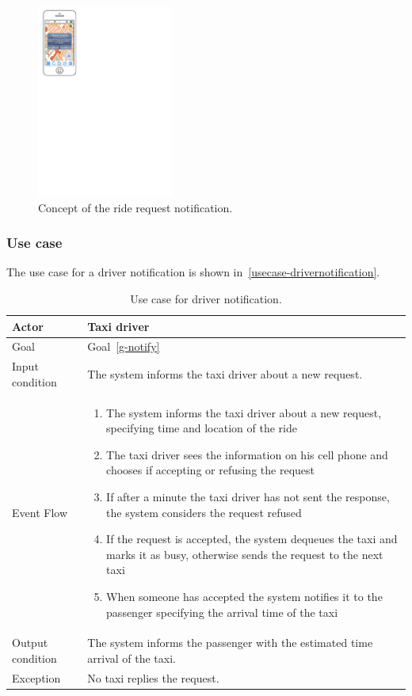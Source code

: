 \begin{figure}
\begin{center}
\includegraphics[width=0.4\textwidth]{mockup/RideRequest.pdf}
\caption{Concept of the ride request notification.}
\label{fig:mockup-riderequest}
\end{center}
\end{figure}

\subsubsection{Use case}
The use case for a driver notification is shown in~\autoref{usecase-drivernotification}.

\begin{table}
\begin{center}
\begin{tabular}{| l | p{} |}
\hline
Actor & Taxi driver \\
\hline
Goal & Goal~\ref{g-notify}
\\
\hline
Input condition & The system informs the taxi driver about a new request.  \\
\hline
Event Flow & \begin{enumerate}
	\item The system informs the taxi driver about a new request, specifying time and location of the ride
	\item The taxi driver sees the information on his cell phone and chooses if accepting or refusing the request
	\item If after a minute the taxi driver has not sent the response, the system considers the request refused
	\item If the request is accepted,  the system dequeues the taxi and marks it as busy, otherwise sends the request to the next taxi
	\item When someone has accepted the system notifies it to the passenger specifying the arrival time of the taxi
	\end{enumerate}
\\
\hline
Output condition & The system informs the passenger with the estimated time arrival of the taxi. \\
\hline
Exception & No taxi replies the request. \\
\hline
\end{tabular}
\end{center}
\caption{Use case for driver notification.}
\label{usecase-drivernotification}
\end{table}

